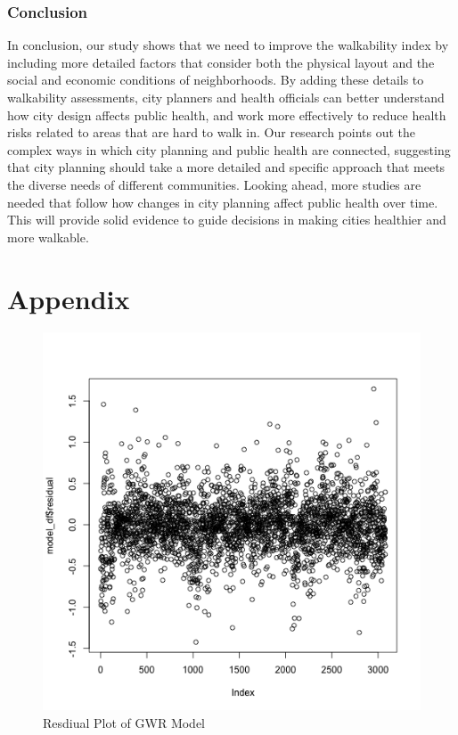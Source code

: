 \documentclass[
]{article}
\begin{document}
\subsubsection{Conclusion}\label{conclusion}

In conclusion, our study shows that we need to improve the walkability
index by including more detailed factors that consider both the physical
layout and the social and economic conditions of neighborhoods. By
adding these details to walkability assessments, city planners and
health officials can better understand how city design affects public
health, and work more effectively to reduce health risks related to
areas that are hard to walk in. Our research points out the complex ways
in which city planning and public health are connected, suggesting that
city planning should take a more detailed and specific approach that
meets the diverse needs of different communities. Looking ahead, more
studies are needed that follow how changes in city planning affect
public health over time. This will provide solid evidence to guide
decisions in making cities healthier and more walkable.

\newpage{}

\section{Appendix}\label{appendix}

\begin{figure}[H]

{\centering \includegraphics{residual_plot.png}

}

\caption{Resdiual Plot of GWR Model}

\end{figure}%
\end{document}
